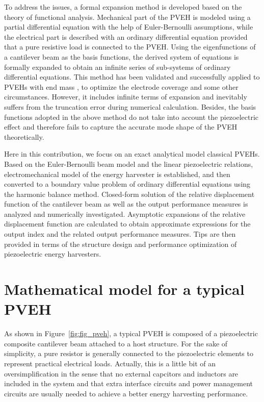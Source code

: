 \documentclass{svjour3}                     %
\begin{document}
To address the issues, a formal expansion method is developed based on the theory of functional analysis. \cite{kreyszig1978introductory} Mechanical part of the PVEH is modeled using a partial differential equation with the help of Euler-Bernoulli assumptions, while the electrical part is described with an ordinary differential equation provided that a pure resistive load is connected to the PVEH. \cite{erturk2008distributed} Using the eigenfunctions of a cantilever beam as the basis functions, the derived system of equations is formally expanded to obtain an infinite series of sub-systems of ordinary differential equations. This method has been validated and successfully applied to PVEHs with end mass \cite{erturk2009experimentally}, to optimize the electrode coverage \cite{erturk2009effect} and some other circumstances. However, it includes infinite terms of expansion and inevitably suffers from the truncation error during numerical calculation. Besides, the basis functions adopted in the above method do not take into account the piezoelectric effect and therefore fails to capture the accurate mode shape of the PVEH theoretically.

Here in this contribution, we focus on an exact analytical model classical PVEHs. Based on the Euler-Bernoulli beam model and the linear piezoelectric relations, electromechanical model of the energy harvester is established, and then converted to a boundary value problem of ordinary differential equations using the harmonic balance method. Closed-form solution of the relative displacement function of the cantilever beam as well as the output performance measures is analyzed and numerically investigated. Asymptotic expansions of the relative displacement function are calculated to obtain approximate expressions for the output index and the related output performance measures. Tips are then provided in terms of the structure design and performance optimization of piezoelectric energy harvesters. 


\section{Mathematical model for a typical PVEH}

As shown in Figure~\ref{fig:fig_pveh}, a typical PVEH is composed of a piezoelectric composite cantilever beam attached to a host structure. For the sake of simplicity, a pure resistor is generally connected to the piezoelectric elements to represent practical electrical loads. Actually, this is a little bit of an oversimplification in the sense that no external capcitors and inductors are included in the system and that extra interface circuits and power management circuits are usually needed to achieve a better energy harvesting performance. \cite{shu2006analysis,shu2007improved,qiu2009comparison} 
\end{document}
